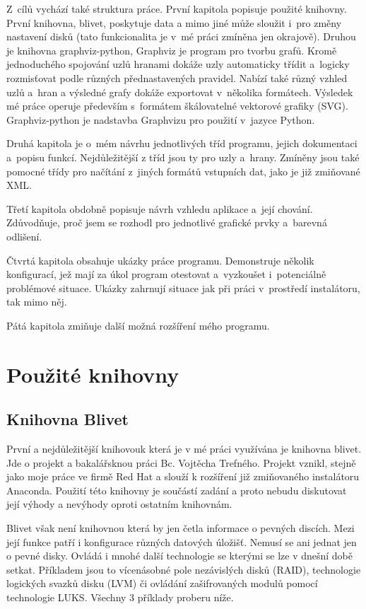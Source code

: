 \documentclass[color,table,oneside,nolot,nolof]{fithesis}
\begin{document}
	Z~cílů vychází také struktura práce. První kapitola popisuje použité knihovny. První knihovna, blivet\cite{blivet}, poskytuje data a mimo jiné může sloužit i~pro změny 
	nastavení disků (tato funkcionalita je v~mé práci zmíněna jen okrajově). Druhou je knihovna graphviz-python\cite{graphviz-python}, Graphviz je program pro tvorbu grafů. Kromě
	jednoduchého spojování uzlů hranami dokáže uzly automaticky třídit a~logicky rozmisťovat podle různých přednastavených pravidel. Nabízí také různý vzhled uzlů
	a~hran a výsledné grafy dokáže exportovat v~několika formátech. Výsledek mé práce operuje především s~formátem škálovatelné vektorové grafiky (SVG). Graphviz-python je 
	nadstavba Graphvizu pro použití v~jazyce Python.

	Druhá kapitola je o~mém návrhu jednotlivých tříd programu, jejich dokumentaci a~popisu funkcí. Nejdůležitější z tříd jsou ty pro uzly a~hrany. Zmíněny jsou také pomocné třídy 
	pro načítání z~jiných formátů vstupních dat, jako je již zmiňované XML.

	Třetí kapitola obdobně popisuje návrh vzhledu aplikace a~její chování. Zdůvodňuje, proč jsem se rozhodl pro jednotlivé grafické prvky a~barevná odlišení.

	Čtvrtá kapitola obsahuje ukázky práce programu. Demonstruje několik konfigurací, jež mají za úkol program otestovat a~vyzkoušet i~potenciálně problémové situace. Ukázky  
	zahrnují situace jak při práci v~prostředí instalátoru, tak mimo něj.

	Pátá kapitola zmiňuje další možná rozšíření mého programu. 

\chapter{Použité knihovny}
\section{Knihovna Blivet}
	První a nejdůležitější knihovouk která je v mé práci využívána je knihovna blivet. Jde o projekt a bakalářsknou práci Bc. Vojtěcha Trefného. Projekt vznikl, stejně jako moje
	práce ve firmě Red Hat a slouží k rozšíření již zmiňovaného instalátoru Anaconda. Použití této knihovny je součástí zadání a proto nebudu diskutovat její výhody a nevýhody
	oproti ostatním knihovnám. 

	Blivet však není knihovnou která by jen četla informace o pevných discích. Mezi její funkce patří i konfigurace různých datových úložišť. Nemusí se ani jednat jen o pevné disky.
	Ovládá i mnohé další technologie se kterými se lze v dnešní době setkat. Příkladem jsou to vícenásobné pole nezávislých disků (RAID), technologie logických svazků disku (LVM) či 
	ovládání zašifrovaných modulů pomocí technologie LUKS. Všechny 3 příklady proberu níže.
\end{document}
